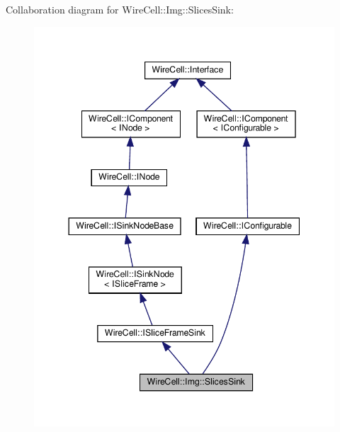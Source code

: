 Collaboration diagram for Wire\+Cell\+:\+:Img\+:\+:Slices\+Sink\+:
\nopagebreak
\begin{figure}[H]
\begin{center}
\leavevmode
\includegraphics[width=344pt]{class_wire_cell_1_1_img_1_1_slices_sink__coll__graph}
\end{center}
\end{figure}
